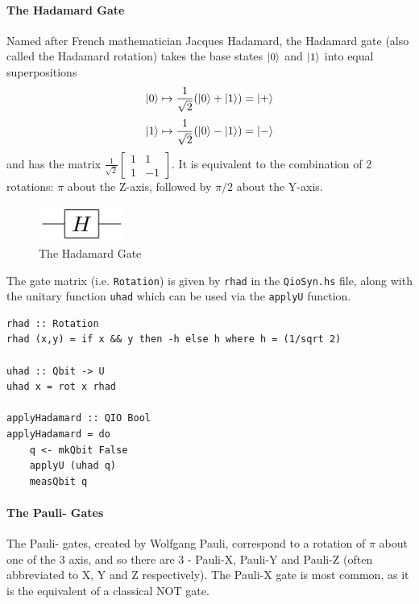 \documentclass[a4paper,11pt, titlepage, twoside]{article}
\begin{document}
\paragraph{The Hadamard Gate}
Named after French mathematician Jacques Hadamard, the Hadamard gate (also called the Hadamard rotation) takes the base states $\ket{0}$ and $\ket{1}$ into equal superpositions
$$\ket{0} \mapsto \frac{1}{\sqrt{2}}(\ket{0} + \ket{1}) = \ket{+}$$
$$\ket{1} \mapsto \frac{1}{\sqrt{2}}(\ket{0} - \ket{1}) = \ket{-}$$
and has the matrix $\frac{1}{\sqrt{2}} 
\begin{bmatrix}
	1 & 1 \\
	1 & -1 
\end{bmatrix} $.
It is equivalent to the combination of 2 rotations: $\pi$ about the Z-axis, followed by $\pi/2$ about the Y-axis.
\begin{figure}[H]
	\centering
	\includegraphics[width=0.25\textwidth]{hadamard}
	\caption{The Hadamard Gate}
\end{figure}
The gate matrix (i.e. \texttt{Rotation}) is given by \texttt{rhad} in the \texttt{QioSyn.hs} file, along with the unitary function \texttt{uhad} which can be used via the \texttt{applyU} function.
\begin{verbatim}
rhad :: Rotation
rhad (x,y) = if x && y then -h else h where h = (1/sqrt 2)

uhad :: Qbit -> U
uhad x = rot x rhad

applyHadamard :: QIO Bool
applyHadamard = do
    q <- mkQbit False
    applyU (uhad q)
    measQbit q
\end{verbatim}

\paragraph{The Pauli- Gates}
The Pauli- gates, created by Wolfgang Pauli, correspond to a rotation of $\pi$ about one of the 3 axis, and so there are 3 - Pauli-X, Pauli-Y and Pauli-Z (often abbreviated to X, Y and Z respectively). The Pauli-X gate is most common, as it is the equivalent of a classical NOT gate.
\end{document}
